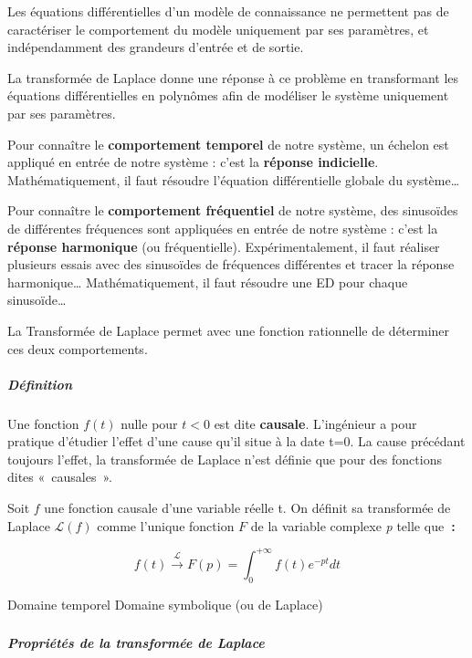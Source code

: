 Les équations différentielles d'un modèle de connaissance ne permettent pas de caractériser le comportement du modèle uniquement par ses paramètres, et indépendamment des grandeurs d'entrée et de sortie.

La transformée de Laplace donne une réponse à ce problème en transformant les équations différentielles en polynômes afin de modéliser le système uniquement par ses paramètres.

Pour connaître le \textbf{comportement temporel} de notre système, un échelon est appliqué en entrée de notre système : c'est la \textbf{réponse indicielle}. Mathématiquement, il faut résoudre l'équation différentielle globale du système\ldots{}

Pour connaître le \textbf{comportement fréquentiel} de notre système, des sinusoïdes de différentes fréquences sont appliquées en entrée de notre système : c'est la \textbf{réponse harmonique} (ou fréquentielle). Expérimentalement, il faut réaliser plusieurs essais avec des sinusoïdes de fréquences différentes et tracer la réponse harmonique\ldots{} Mathématiquement, il faut résoudre une ED pour chaque sinusoïde\ldots{}

La Transformée de Laplace permet avec une fonction rationnelle de déterminer ces deux comportements.

\hypertarget{mod-duxe9finition}{%
\subparagraph*{Définition}\label{mod-duxe9finition}}

Une fonction \(f(t)\) nulle pour \(t < 0\) est dite \textbf{causale}. L'ingénieur a pour pratique d'étudier l'effet d'une cause qu'il situe à la date t=0. La cause précédant toujours l'effet, la transformée de Laplace n'est définie que pour des fonctions dites «~causales~».

Soit \(f\) une fonction causale d'une variable réelle t. On définit sa transformée de Laplace \(\mathcal{L}(f)\) comme l'unique fonction \(F\) de la variable complexe \emph{p} telle que\textbf{~:}

\[f(t)\overset{\mathcal{L}}{\rightarrow}F(p) = \int_{0}^{+ \infty}{f(t)e^{- pt}}dt\]

Domaine temporel Domaine symbolique (ou de Laplace)

\hypertarget{mod-section-1}{%
\subparagraph*{}\label{mod-section-1}}

\hypertarget{mod-propriuxe9tuxe9s-de-la-transformuxe9e-de-laplace}{%
\subparagraph*{Propriétés de la transformée de Laplace}\label{mod-propriuxe9tuxe9s-de-la-transformuxe9e-de-laplace}}

